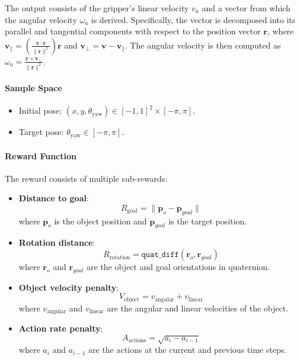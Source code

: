 The output consists of the gripper's linear velocity $v_a$ and a vector from which the angular velocity $\omega_a$ is derived. Specifically, the vector is decomposed into its parallel and tangential components with respect to the position vector $\mathbf{r}$, where $\mathbf{v}_{\parallel} = \left( \frac{\mathbf{v} \cdot \mathbf{r}}{\|\mathbf{r}\|^2} \right) \mathbf{r}$ and $\mathbf{v}_{\perp} = \mathbf{v} - \mathbf{v}_{\parallel}$. The angular velocity is then computed as $\omega_a = \frac{\mathbf{r} \times \mathbf{v}_{\perp}}{\|\mathbf{r}\|^2}$.

\paragraph{Sample Space}
\begin{itemize}
    \item Initial pose: $(x, y, \theta_\text{yaw}) \in [-1, 1]^2 \times [-\pi, \pi]$.
    \item Target pose: $\theta_\text{yaw} \in [-\pi, \pi]$.
\end{itemize}

\paragraph{Reward Function}
The reward consists of multiple sub-rewards:

\begin{itemize}
    \item \textbf{Distance to goal}: \[
        R_\text{goal} = \lVert \mathbf{p}_o - \mathbf{p}_{goal} \rVert
    \]
    where $\mathbf{p}_o$ is the object position and $\mathbf{p}_{goal}$ is the target position.
    \item \textbf{Rotation distance}: \[
        R_\text{rotation} = \texttt{quat\_diff}(\mathbf{r}_o, \mathbf{r}_{goal})
    \]
    where $\mathbf{r}_o$ and $\mathbf{r}_{goal}$ are the object and goal orientations in quaternion.
    \item \textbf{Object velocity penalty}: \[
        V_{\text{object}} = v_{\text{angular}} + v_{\text{linear}}
    \]
    where $v_{\text{angular}}$ and $v_{\text{linear}}$ are the angular and linear velocities of the object.
    \item \textbf{Action rate penalty}: \[
A_{\text{actions}} = \sqrt{a_i - a_{i-1}}
\]
where $a_i$ and $a_{i-1}$ are the actions at the current and previous time steps.

\end{itemize}

